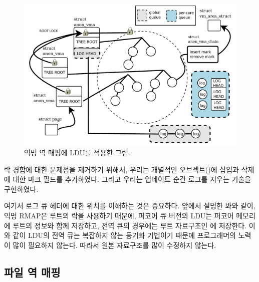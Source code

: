\begin{figure}[tb]
  \begin{center}
     \includegraphics[width=1\textwidth,height=1\textheight,keepaspectratio]{fig/anon_vma}
  \end{center}
  \caption{익명 역 매핑에 LDU를 적용한 그림.}
  \label{fig:anonvmaramp}
\end{figure}

락 경합에 대한 문제점을 제거하기 위해서, 우리는 개별적인 오브젝트()에 
삽입과 삭제에 대한 마크 필드를 추가하였다. 
그리고 우리는 업데이트 순간 로그를 지우는 기술을 구현하였다.

여기서 로그 큐 헤더에 대한 위치를 이해하는 것은 중요하다.
앞에서 설명한 봐와 같이, 익명 RMAP은 루트의 락을 사용하기 때문에, 퍼코어 큐 버전의 LDU는 
퍼코어 메모리에 루트의 정보와 함께 저장하고, 전역 큐의 경우에는 루트 자료구조인 에 
저장한다. 
이와 같이 LDU의 전역 큐는 복잡하지 않는 동기화 기법이기 때문에 프로그래머의 노력이 많이 필요하지 않는다.
따라서 원본 자료구조를 많이 수정하지 않는다. 

\subsection{파일 역 매핑}

